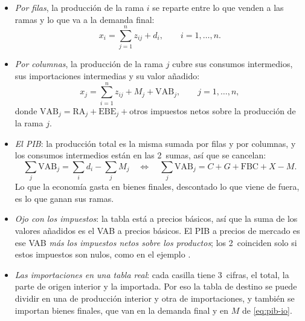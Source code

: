 \documentclass[11pt]{article}
\begin{document}
\begin{itemize}
\item \emph{Por filas}, la producción de la rama $i$ se reparte entre lo que venden a las ramas y lo que va a la demanda final:
\begin{equation}\label{eq:filas}
x_i=\sum_{j=1}^{n}z_{ij}+d_i,\qquad i=1,\dots,n.
\end{equation}
\item \emph{Por columnas}, la producción de la rama $j$ cubre sus consumos intermedios, sus importaciones intermedias y su valor añadido:
\begin{equation}\label{eq:columnas}
x_j=\sum_{i=1}^{n}z_{ij}+M_j+\mathrm{VAB}_j,\qquad j=1,\dots,n,
\end{equation}
  donde $\mathrm{VAB}_j=\mathrm{RA}_j+\mathrm{EBE}_j+{}$otros impuestos netos sobre la producción de la rama $j$.
\item \emph{El PIB}: la producción total es la misma sumada por filas y por columnas, y los consumos intermedios están en las 2~sumas, así que se cancelan:
\begin{equation}\label{eq:pib-io}
\sum_{j}\mathrm{VAB}_j=\sum_{i}d_i-\sum_{j}M_j\quad\Longleftrightarrow\quad \sum_{j}\mathrm{VAB}_j=C+G+\mathrm{FBC}+X-M.
\end{equation}
  Lo que la economía gasta en bienes finales, descontado lo que viene de fuera, es lo que ganan sus ramas.
\item \emph{Ojo con los impuestos}: la tabla está a precios básicos, así que la suma de los valores añadidos es el VAB a precios básicos. El PIB a precios de mercado es ese VAB \emph{más los impuestos netos sobre los productos}; los 2~coinciden solo si estos impuestos son nulos, como en el ejemplo .
\item \emph{Las importaciones en una tabla real}: cada casilla tiene 3~cifras, el total, la parte de origen interior y la importada. Por eso la tabla de destino se puede dividir en una de producción interior y otra de importaciones, y también se importan bienes finales, que van en la demanda final y en $M$ de \eqref{eq:pib-io}.
\end{itemize}
\end{document}
